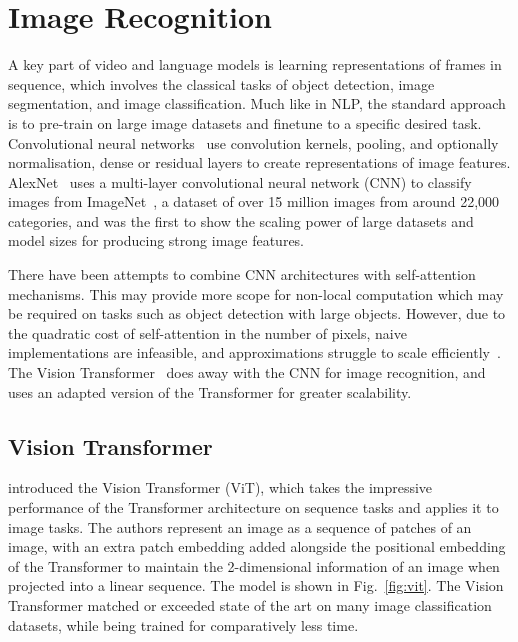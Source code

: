 \section{Image Recognition}
\label{sec:imrec}

A key part of video and language models is learning representations of frames
in sequence, which involves the classical tasks of object detection, image
segmentation, and image classification. Much like in NLP, the standard approach
is to pre-train on large image datasets and finetune to a specific desired
task. Convolutional neural
networks~\citep{lecun1989lenet,krizhevsky2012alexnet,he2016resnet} use
convolution kernels, pooling, and optionally normalisation, dense or residual
layers to create representations of image features.
AlexNet~\citep{krizhevsky2012alexnet} uses a multi-layer convolutional neural
network (CNN) to classify images from ImageNet~\cite{imagenet}, a dataset of
over 15 million images from around 22,000 categories, and was the first to show
the scaling power of large datasets and model sizes for producing strong image
features. 

There have been attempts to combine CNN architectures with self-attention
mechanisms. This may provide more scope for non-local computation which may be
required on tasks such as object detection with large objects. However, due to
the quadratic cost of self-attention in the number of pixels, naive
implementations are infeasible, and approximations struggle to scale
efficiently~\cite{carion2020detr}. The Vision Transformer~\cite{dosovitskiy2021vit}
does away with the CNN for image recognition, and uses an adapted version of
the Transformer for greater scalability.


\subsection{Vision Transformer}
\label{ssec:vit}

\cite{dosovitskiy2021vit} introduced the Vision Transformer (ViT), which takes
the impressive performance of the Transformer architecture on sequence tasks
and applies it to image tasks. The authors represent an image as a sequence of
patches of an image, with an extra patch embedding added alongside the
positional embedding of the Transformer \cite{vaswani2017attention} to maintain
the 2-dimensional information of an image when projected into a linear
sequence. The model is shown in Fig.~\ref{fig:vit}.  The Vision Transformer
matched or exceeded state of the art on many image classification datasets,
while being trained for comparatively less time.

